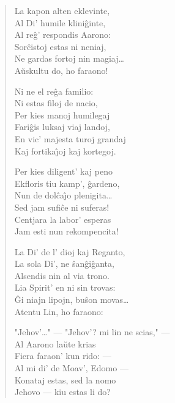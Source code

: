 \begin{verse}
                     La kapon alten eklevinte,\\
                     Al Di' humile klini\^ginte,\\
                     Al re\^g' respondis Aarono:\\
                     Sor\^cistoj estas ni neniaj,\\
                     Ne gardas fortoj nin magiaj\dots\\
                     A\u uskultu do, ho faraono!

                     Ni ne el re\^ga familio:\\
                     Ni estas filoj de nacio,\\
                     Per kies manoj humilegaj\\
                     Fari\^gis luksaj viaj landoj,\\
                     En vic' majesta turoj grandaj\\
                     Kaj fortika\^{\j}oj kaj kortegoj.

                     Per kies diligent' kaj peno\\
                     Ekfloris tiu kamp', \^gardeno,\\
                     Nun de dol\^ca\^{\j}o plenigita\dots\\
                     Sed jam sufi\^ce ni suferas!\\
                     Centjara la labor' esperas\\
                     Jam esti nun rekompencita!

                     La Di' de l' dioj kaj Reganto,\\
                     La sola Di', ne \^san\^gi\^ganta,\\
                     Alsendis nin al via trono.\\
                     Lia Spirit' en ni sin trovas:\\
                     \^Gi niajn lipojn, bu\^son movas\dots\\
                     Atentu Lin, ho faraono:

                     "Jehov'\dots" --- "Jehov'? mi lin ne scias," ---\\
                     Al Aarono la\u ute krias\\
                     Fiera faraon' kun rido: ---\\
                     Al mi di' de Moav', Edomo ---\\
                     Konataj estas, sed la nomo\\
                     Jehovo --- kiu estas li do?


\end{verse}
